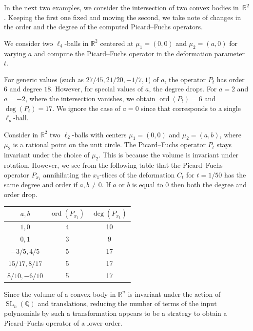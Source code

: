 \documentclass[sigconf, nonacm]{acmart} %
\newcommand{\ord}[0]{{\operatorname{ord}}}
\begin{document}
In the next two examples, we consider the intersection of two convex bodies in~$\mathbb R^2$. Keeping the first one fixed and moving the second, we take note of changes in the order and the degree of the computed Picard--Fuchs operators.

\begin{example}
    We consider two $\ell_4$-balls in $\mathbb R^2$ centered at $\mu_1 = (0,0)$ and $\mu_2 = (a,0)$ for varying $a$ and compute the Picard--Fuchs operator in the deformation parameter~$t$. 

    For generic values (such as $27/45, 21/20, -1/7, 1$) of $a$, the operator $P_t$ has order $6$ and degree $18$. 
    However, for special values of $a$, the degree drops. For $a = 2$ and $a = -2$, where the intersection vanishes, we obtain $\ord(P_t) = 6$ and $\deg(P_t) = 17$. We ignore the case of $a = 0$ since that corresponds to a single $\ell_p$-ball.

\end{example}


\begin{example}
    Consider in $\mathbb R^2$ two $\ell_2$-balls with centers $\mu_1 = (0,0)$ and $\mu_2 = (a,b)$, where $\mu_2$ is a rational point on the unit circle. The Picard--Fuchs operator $P_t$ stays invariant under the choice of $\mu_2$.
    This is because the volume is invariant under rotation. 
    However, we see from the following table that the Picard--Fuchs operator $P_{x_1}$ annihilating the $x_1$-slices of the deformation $C_t$ for $t = 1/50$ has the same degree and order if $a, b \neq 0$. If $a$ or $b$ is equal to $0$ then both the degree and order drop. 

    \begin{center}
    \begin{tabular}{ |c|c|c| } 
     \hline
     $a,b$ & $\ord(P_{x_1})$ & $\deg(P_{x_1})$ \\ 
     \hline
     $1,0$ & 4 & 10 \\ 
     $0,1$ & 3 & 9 \\ 
     $-3/5,4/5$ & 5 & 17 \\ 
     $15/17,8/17$ & 5 & 17 \\ 
     $8/10,-6/10$ & 5 & 17\\ 
     \hline
    \end{tabular}
    \end{center}
\end{example}

Since the volume of a convex body in $\mathbb{R}^n$ is invariant under the action of $\operatorname{SL}_n(\mathbb Q)$ and translations, reducing the number of terms of the input polynomials by such a transformation appears to be a strategy to obtain a Picard--Fuchs operator of a lower order.
\end{document}
